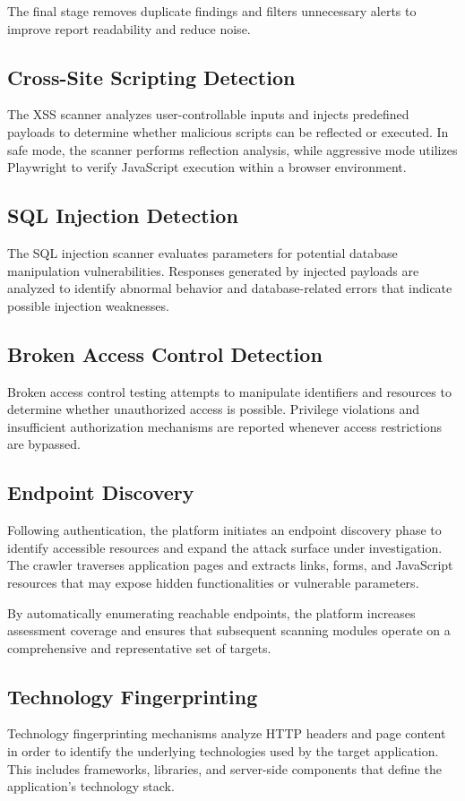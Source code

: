 The final stage removes duplicate findings and filters unnecessary alerts to improve report readability and reduce noise.

\subsection{Cross-Site Scripting Detection}
The XSS scanner analyzes user-controllable inputs and injects predefined payloads to determine whether malicious scripts can be reflected or executed. In safe mode, the scanner performs reflection analysis, while aggressive mode utilizes Playwright to verify JavaScript execution within a browser environment.

\subsection{SQL Injection Detection}
The SQL injection scanner evaluates parameters for potential database manipulation vulnerabilities. Responses generated by injected payloads are analyzed to identify abnormal behavior and database-related errors that indicate possible injection weaknesses.

\subsection{Broken Access Control Detection}
Broken access control testing attempts to manipulate identifiers and resources to determine whether unauthorized access is possible. Privilege violations and insufficient authorization mechanisms are reported whenever access restrictions are bypassed.

\subsection{Endpoint Discovery}
Following authentication, the platform initiates an endpoint discovery phase to identify accessible resources and expand the attack surface under investigation. The crawler traverses application pages and extracts links, forms, and JavaScript resources that may expose hidden functionalities or vulnerable parameters.

By automatically enumerating reachable endpoints, the platform increases assessment coverage and ensures that subsequent scanning modules operate on a comprehensive and representative set of targets.

\subsection{Technology Fingerprinting}
Technology fingerprinting mechanisms analyze HTTP headers and page content in order to identify the underlying technologies used by the target application. This includes frameworks, libraries, and server-side components that define the application's technology stack.

